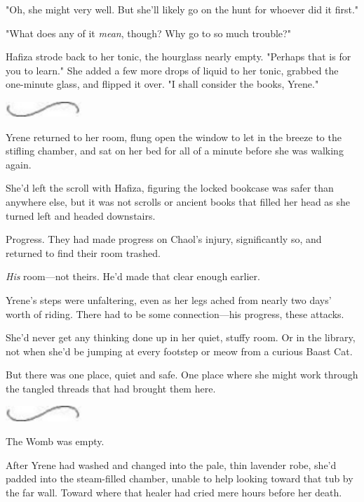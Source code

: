 "Oh, she might very well.
But she'll likely go on the hunt for whoever did it first."

"What does any of it \emph{mean}, though?
Why go to so much trouble?"

Hafiza strode back to her tonic, the hourglass nearly empty.
"Perhaps that is for you to learn."
She added a few more drops of liquid to her tonic, grabbed the one-minute glass, and flipped it over.
"I shall consider the books, Yrene."

\begin{center}
	\includegraphics[width=1.12in,height=0.24in]{images/seperator}
\end{center}

Yrene returned to her room, flung open the window to let in the breeze to the stifling chamber, and sat on her bed for all of a minute before she was walking again.

She'd left the scroll with Hafiza, figuring the locked bookcase was safer than anywhere else, but it was not scrolls or ancient books that filled her head as she turned left and headed downstairs.

Progress.
They had made progress on Chaol's injury, significantly so, and returned to find their room trashed.

\emph{His} room---not theirs.
He'd made that clear enough earlier.

Yrene's steps were unfaltering, even as her legs ached from nearly two days' worth of riding.
There had to be some connection---his progress, these attacks.

She'd never get any thinking done up in her quiet, stuffy room.
Or in the library, not when she'd be jumping at every footstep or meow from a curious Baast Cat.

But there was one place, quiet and safe.
One place where she might work through the tangled threads that had brought them here.

\begin{center}
	\includegraphics[width=1.12in,height=0.24in]{images/seperator}
\end{center}

The Womb was empty.

After Yrene had washed and changed into the pale, thin lavender robe, she'd padded into the steam-filled chamber, unable to help looking toward that tub by the far wall.
Toward where that healer had cried mere hours before her death.

